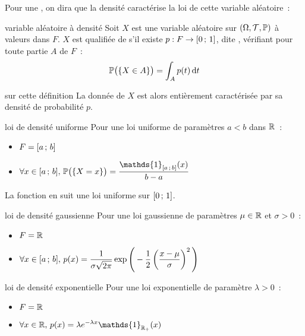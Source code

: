 Pour une , on dira que la densité caractérise la loi de cette variable aléatoire~:

\begin{definition}{}{variable aléatoire à densité}
    Soit $X$ est une variable aléatoire sur $(\Omega, \mathcal{T}, \mathbb{P})$ à valeurs dans $F$.
    $X$ est qualifiée de  s'il existe $p : F \to [0\, ; \, 1]$, dite , vérifiant pour toute partie $A$ de $F$~:
    $$\mathbb{P}\big(\{X \in A\}\big) = \int_A p(t)\,\mathrm{d}t$$
\end{definition}

\begin{remarque}{}{sur cette définition}
    La donnée de $X$ est alors entièrement caractérisée par sa densité de probabilité $p$.
\end{remarque}

\begin{exemple}{}{loi de densité uniforme}
    Pour une loi uniforme de paramètres $a<b$ dans $\mathbb{R}$~:
    \begin{itemize}
        \item $\displaystyle F = [a\, ; \, b]$
        \item $\displaystyle \forall x \in \seg{a}{b},\, \probaset{X = x} = \frac{\mathds{1}_{\seg{a}{b}}(x)}{b-a}$
    \end{itemize}
    La fonction  en  suit une loi uniforme sur $[0\, ; \, 1]$.
\end{exemple}

\begin{exemple}{}{loi de densité gaussienne}
    Pour une loi gaussienne de paramètres $\mu \in \mathbb{R}$ et $\sigma > 0$~:
    \begin{itemize}
        \item $\displaystyle F = \mathbb{R}$
        \item $\displaystyle \forall x \in [a\, ; \, b],\, p(x) = \frac1{\sigma \sqrt{2\pi}}\operatorname \exp\Bigg(-\frac12\left(\frac{x-\mu}{\sigma}\right)^2\Bigg)$
    \end{itemize}
\end{exemple}


\begin{exemple}{}{loi de densité exponentielle}
    Pour une loi exponentielle de paramètre $\lambda > 0$~:
    \begin{itemize}
        \item $\displaystyle F = \mathbb{R}$
        \item $\displaystyle \forall x \in \R,\, p(x) = \lambda e^{-\lambda x} \mathds{1}_{\R_+}(x)$
    \end{itemize}
\end{exemple}

